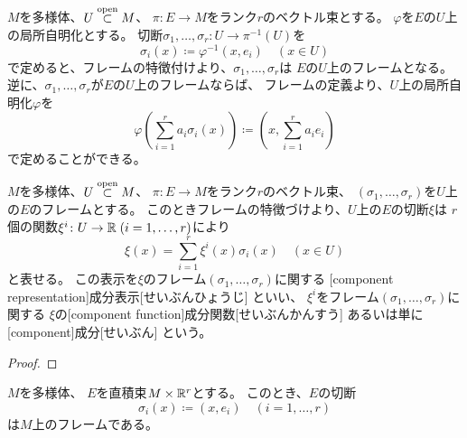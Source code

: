 \documentclass[report]{jlreq}
\begin{document}
\begin{remark}[局所自明化とフレームの対応]
    $M$を多様体、$U \stackrel{\text{open}}{\subset} M$、
    $\pi \colon E \to M$をランク$r$のベクトル束とする。
    $\varphi$を$E$の$U$上の局所自明化とする。
    切断$\sigma_1, \dots, \sigma_r \colon U \to \pi^{-1}(U)$を
    \begin{equation}
        \sigma_i(x) \coloneqq \varphi^{-1}(x, e_i) \quad (x \in U)
    \end{equation}
    で定めると、フレームの特徴付けより、$\sigma_1, \dots, \sigma_r$は
    $E$の$U$上のフレームとなる。
    逆に、$\sigma_1, \dots, \sigma_r$が$E$の$U$上のフレームならば、
    フレームの定義より、$U$上の局所自明化$\varphi$を
    \begin{equation}
        \varphi\left(\sum_{i=1}^r a_i \sigma_i(x) \right)
            \coloneqq \left(x, \sum_{i=1}^r a_i e_i \right)
    \end{equation}
    で定めることができる。
\end{remark}

\begin{definition}[フレームに関する成分表示]
    $M$を多様体、$U \stackrel{\text{open}}{\subset} M$、
    $\pi \colon E \to M$をランク$r$のベクトル束、
    $(\sigma_1, \dots, \sigma_r)$を$U$上の$E$のフレームとする。
    このときフレームの特徴づけより、$U$上の$E$の切断$\xi$は
    $r$個の関数$\xi^i \colon U \to \mathbb{R} \; (i = 1, \dots, r)$により
    \begin{equation}
        \xi(x) = \sum_{i = 1}^r \xi^i(x) \sigma_i(x)
            \quad
            (x \in U)
    \end{equation}
    と表せる。
    この表示を$\xi$のフレーム$(\sigma_1, \dots, \sigma_r)$に関する
    [component representation]{成分表示}[せいぶんひょうじ]
    といい、
    $\xi^i$をフレーム$(\sigma_1, \dots, \sigma_r)$に関する
    $\xi$の[component function]{成分関数}[せいぶんかんすう]
    あるいは単に
    [component]{成分}[せいぶん]
    という。
\end{definition}

\begin{proposition}
    \TODO{}
\end{proposition}

\begin{proof}
    \TODO{}
\end{proof}

\begin{proposition}[直積束ならばフレームがある]
    $M$を多様体、
    $E$を直積束$M \times \mathbb{R}^r$とする。
    このとき、$E$の切断
    \begin{equation}
        \sigma_i(x) \coloneqq (x, e_i)
        \quad (i = 1, \dots, r)
    \end{equation}
    は$M$上のフレームである。
\end{proposition}
\end{document}
